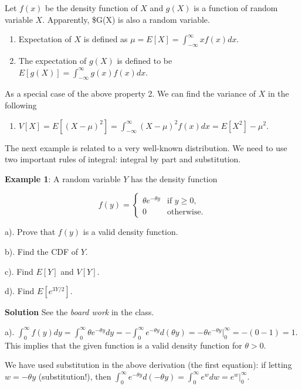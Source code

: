 \documentclass[
]{book}
\providecommand{\tightlist}{%
  \setlength{\itemsep}{0pt}\setlength{\parskip}{0pt}}
\begin{document}
Let \(f(x)\) be the density function of \(X\) and \(g(X)\) is a function of random variable \(X\). Apparently, \$G(X) is also a random variable.

\begin{enumerate}
\def\labelenumi{\arabic{enumi}.}
\item
  Expectation of \(X\) is defined as \(\mu = E[X] = \int_{-\infty}^\infty x f(x)dx\).
\item
  The expectation of \(g(X)\) is defined to be \(E[g(X)] = \int_{-\infty}^\infty g(x) f(x)dx\).
\end{enumerate}

As a special case of the above property 2. We can find the variance of \(X\) in the following

\begin{enumerate}
\def\labelenumi{\arabic{enumi}.}
\setcounter{enumi}{2}
\tightlist
\item
  \(V[X] = E[(X - \mu)^2] = \int_{-\infty}^\infty (X - \mu)^2f(x)dx = E[X^2] - \mu^2.\)
\end{enumerate}

\hfill\break

The next example is related to a very well-known distribution. We need to use two important rules of integral: integral by part and substitution.

\textbf{Example 1}: A random variable \(Y\) has the density function

\[
\displaystyle f(y) = \begin{cases} 
 \theta e^{-\theta y} & \text{if $y \ge 0$}, \\  
 0 & \text{otherwise}.
 \end{cases}
\]

a). Prove that \(f(y)\) is a valid density function.

b). Find the CDF of \(Y\).

c). Find \(E[Y]\) and \(V[Y]\).

d). Find \(E[e^{3Y/2}]\).

\textbf{Solution} See the \emph{board work} in the class.

a). \(\int_0^\infty f(y)dy = \int_0^\infty \theta e^{-\theta y} dy = - \int_0^\infty e^{-\theta y} d(\theta y) = -\theta e^{-\theta y}|_0^\infty = - (0 - 1) = 1\). This implies that the given function is a valid density function for \(\theta >0\).

We have used substitution in the above derivation (the first equation): if letting \(w = -\theta y\) (substitution!), then \(\int_0^\infty e^{-\theta y} d(-\theta y) = \int_0^\infty e^wdw = e^w|_0^\infty\).
\end{document}
